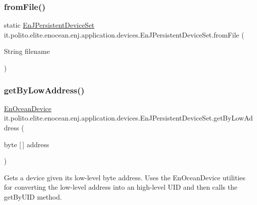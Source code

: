 \subsubsection{\texorpdfstring{from\+File()}{fromFile()}}
{\footnotesize\ttfamily static \hyperlink{classit_1_1polito_1_1elite_1_1enocean_1_1enj_1_1application_1_1devices_1_1_en_j_persistent_device_set}{En\+J\+Persistent\+Device\+Set} it.\+polito.\+elite.\+enocean.\+enj.\+application.\+devices.\+En\+J\+Persistent\+Device\+Set.\+from\+File (\begin{DoxyParamCaption}\item[{String}]{filename }\end{DoxyParamCaption})\hspace{0.3cm}{\ttfamily [static]}}

\hypertarget{classit_1_1polito_1_1elite_1_1enocean_1_1enj_1_1application_1_1devices_1_1_en_j_persistent_device_set_adf0068a56b5a2e628ef4c16cf407ceaa}{}\label{classit_1_1polito_1_1elite_1_1enocean_1_1enj_1_1application_1_1devices_1_1_en_j_persistent_device_set_adf0068a56b5a2e628ef4c16cf407ceaa} 
\subsubsection{\texorpdfstring{get\+By\+Low\+Address()}{getByLowAddress()}}
{\footnotesize\ttfamily \hyperlink{classit_1_1polito_1_1elite_1_1enocean_1_1enj_1_1model_1_1_en_ocean_device}{En\+Ocean\+Device} it.\+polito.\+elite.\+enocean.\+enj.\+application.\+devices.\+En\+J\+Persistent\+Device\+Set.\+get\+By\+Low\+Address (\begin{DoxyParamCaption}\item[{byte \mbox{[}$\,$\mbox{]}}]{address }\end{DoxyParamCaption})}

Gets a device given its low-\/level byte address. Uses the En\+Ocean\+Device utilities for converting the low-\/level address into an high-\/level U\+ID and then calls the get\+By\+U\+ID method.


